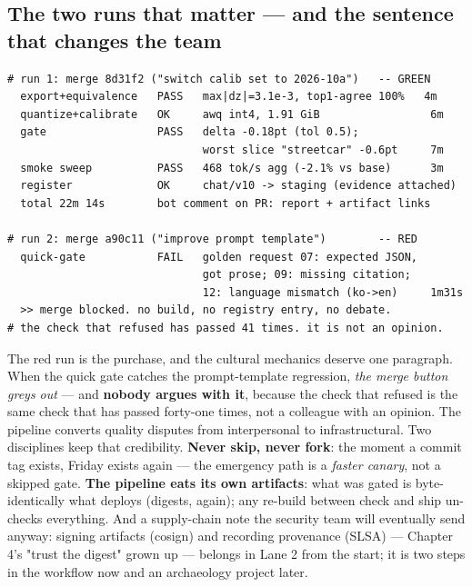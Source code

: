 \subsection*{The two runs that matter — and the sentence that changes the team}

\begin{terminalbox}
\begin{Verbatim}[breaklines=true,breakanywhere=true,fontsize=\small,formatcom=\color{tbbtermfg},codes=\tbbcodeactive]
# run 1: merge 8d31f2 ("switch calib set to 2026-10a")   -- GREEN
  export+equivalence   PASS   max|dz|=3.1e-3, top1-agree 100%   4m
  quantize+calibrate   OK     awq int4, 1.91 GiB                 6m
  gate                 PASS   delta -0.18pt (tol 0.5);
                              worst slice "streetcar" -0.6pt     7m
  smoke sweep          PASS   468 tok/s agg (-2.1% vs base)      3m
  register             OK     chat/v10 -> staging (evidence attached)
  total 22m 14s        bot comment on PR: report + artifact links

# run 2: merge a90c11 ("improve prompt template")        -- RED
  quick-gate           FAIL   golden request 07: expected JSON,
                              got prose; 09: missing citation;
                              12: language mismatch (ko->en)     1m31s
  >> merge blocked. no build, no registry entry, no debate.
# the check that refused has passed 41 times. it is not an opinion.
\end{Verbatim}
\end{terminalbox}

The red run is the purchase, and the cultural mechanics deserve one paragraph. When the quick gate catches the prompt-template regression, \textit{the merge button greys out} — and \textbf{nobody argues with it}, because the check that refused is the same check that has passed forty-one times, not a colleague with an opinion. The pipeline converts quality disputes from interpersonal to infrastructural. Two disciplines keep that credibility. \textbf{Never skip, never fork}: the moment a  commit tag exists, Friday exists again — the emergency path is a \textit{faster canary}, not a skipped gate. \textbf{The pipeline eats its own artifacts}: what was gated is byte-identically what deploys (digests, again); any re-build between check and ship un-checks everything. And a supply-chain note the security team will eventually send anyway: signing artifacts (cosign) and recording provenance (SLSA) — Chapter 4's "trust the digest" grown up — belongs in Lane 2 from the start; it is two steps in the workflow now and an archaeology project later.

